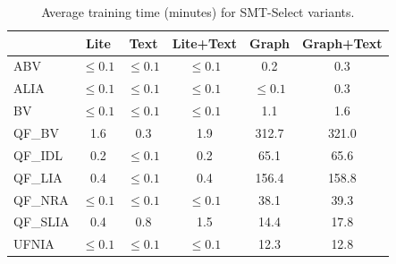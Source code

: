 \begin{table}[t]
\centering
\begin{tabular}{lccccc}
\toprule
 & Lite & Text & Lite+Text & Graph & Graph+Text \\
\midrule
ABV & $\leq 0.1$ & $\leq 0.1$ & $\leq 0.1$ & 0.2 & 0.3 \\
ALIA & $\leq 0.1$ & $\leq 0.1$ & $\leq 0.1$ & $\leq 0.1$ & 0.3 \\
BV & $\leq 0.1$ & $\leq 0.1$ & $\leq 0.1$ & 1.1 & 1.6 \\
QF\_BV & 1.6 & 0.3 & 1.9 & 312.7 & 321.0 \\
QF\_IDL & 0.2 & $\leq 0.1$ & 0.2 & 65.1 & 65.6 \\
QF\_LIA & 0.4 & $\leq 0.1$ & 0.4 & 156.4 & 158.8 \\
QF\_NRA & $\leq 0.1$ & $\leq 0.1$ & $\leq 0.1$ & 38.1 & 39.3 \\
QF\_SLIA & 0.4 & 0.8 & 1.5 & 14.4 & 17.8 \\
UFNIA & $\leq 0.1$ & $\leq 0.1$ & $\leq 0.1$ & 12.3 & 12.8 \\
\bottomrule
\end{tabular}
\caption{Average training time (minutes) for SMT-Select variants.}
\label{tab:train_time}
\end{table}
